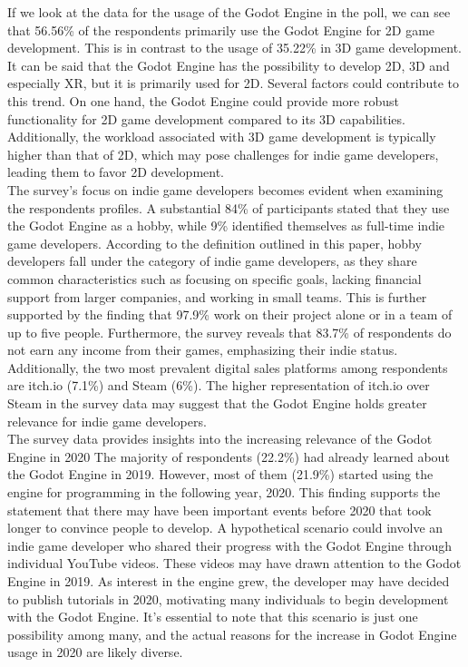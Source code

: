 If we look at the data for the usage of the Godot Engine in the poll, we can see that 56.56\% of the respondents primarily use the Godot Engine for 2D game development.
This is in contrast to the usage of 35.22\% in 3D game development.
It can be said that the Godot Engine has the possibility to develop 2D, 3D and especially XR, but it is primarily used for 2D.
Several factors could contribute to this trend.
On one hand, the Godot Engine could provide more robust functionality for 2D game development compared to its 3D capabilities. 
Additionally, the workload associated with 3D game development is typically higher than that of 2D, which may pose challenges for indie game developers, leading them to favor 2D development.\\

The survey's focus on indie game developers becomes evident when examining the respondents profiles.
A substantial 84\% of participants stated that they use the Godot Engine as a hobby, while 9\% identified themselves as full-time indie game developers. 
According to the definition outlined in this paper, hobby developers fall under the category of indie game developers, as they share common characteristics such as focusing on specific goals, lacking financial support from larger companies, and working in small teams. 
This is further supported by the finding that 97.9\% work on their project alone or in a team of up to five people.
Furthermore, the survey reveals that 83.7\% of respondents do not earn any income from their games, emphasizing their indie status.
Additionally, the two most prevalent digital sales platforms among respondents are itch.io (7.1\%) and Steam (6\%).
The higher representation of itch.io over Steam in the survey data may suggest that the Godot Engine holds greater relevance for indie game developers. \\

The survey data provides insights into the increasing relevance of the Godot Engine in 2020
The majority of respondents (22.2\%) had already learned about the Godot Engine in 2019.
However, most of them (21.9\%) started using the engine for programming in the following year, 2020.
This finding supports the statement that there may have been important events before 2020 that took longer to convince people to develop.
A hypothetical scenario could involve an indie game developer who shared their progress with the Godot Engine through individual YouTube videos.
These videos may have drawn attention to the Godot Engine in 2019.
As interest in the engine grew, the developer may have decided to publish tutorials in 2020, motivating many individuals to begin development with the Godot Engine.
It's essential to note that this scenario is just one possibility among many, and the actual reasons for the increase in Godot Engine usage in 2020 are likely diverse.
